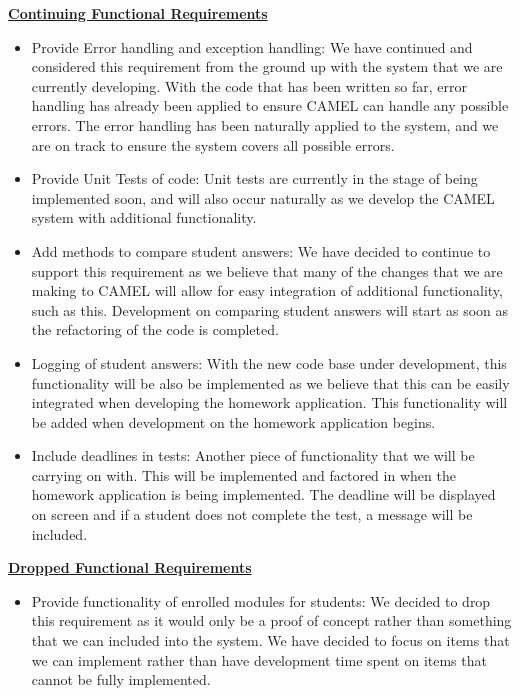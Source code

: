 	\underline{\textbf{Continuing Functional Requirements}}
	\begin{itemize}
		\item Provide Error handling and exception handling: We have continued and considered this requirement from the ground up with the system that we are currently developing. With the code that has been written so far, error handling has already been applied to ensure CAMEL can handle any possible errors. The error handling has been naturally applied to the system, and we are on track to ensure the system covers all possible errors. 
		
		\item Provide Unit Tests of code: Unit tests are currently in the stage of being implemented soon, and will also occur naturally as we develop the CAMEL system with additional functionality.  
		
		\item Add methods to compare student answers: We have decided to continue to support this requirement as we believe that many of the changes that we are making to CAMEL will allow for easy integration of additional functionality, such as this. Development on comparing student answers will start as soon as the refactoring of the code is completed.  
		
		\item Logging of student answers: With the new code base under development, this functionality will be also be implemented as we believe that this can be easily integrated when developing the homework application. This functionality will be added when development on the homework application begins.  
		
		\item Include deadlines in tests: Another piece of functionality that we will be carrying on with. This will be implemented and factored in when the homework application is being implemented. The deadline will be displayed on screen and if a student does not complete the test, a message will be included.  
	\end{itemize}
	
	\underline{\textbf{Dropped Functional Requirements}}
	\begin{itemize}
		\item Provide functionality of enrolled modules for students: We decided to drop this requirement as it would only be a proof of concept rather than something that we can included into the system. We have decided to focus on items that we can implement rather than have development time spent on items that cannot be fully implemented.  
	\end{itemize}
		
